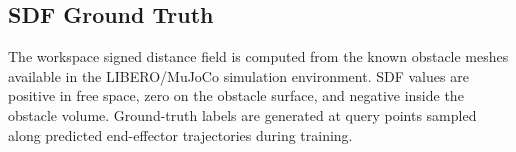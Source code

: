 \subsection{SDF Ground Truth}\label{sec:sdf_gt}

The workspace signed distance field is computed from the known obstacle meshes available in the LIBERO/MuJoCo simulation environment. SDF values are positive in free space, zero on the obstacle surface, and negative inside the obstacle volume. Ground-truth labels are generated at query points sampled along predicted end-effector trajectories during training.
